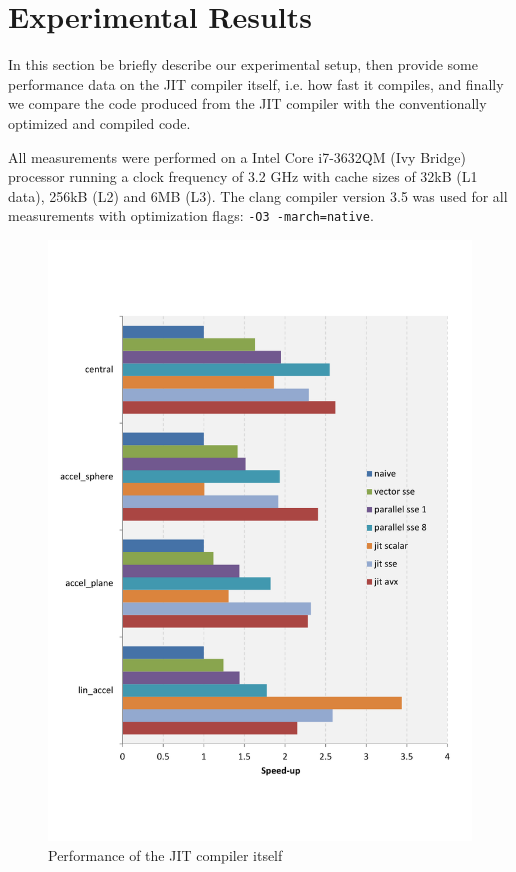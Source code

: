 \section{Experimental Results}\label{sec:exp}

In this section be briefly describe our experimental setup, then provide some performance data on the JIT compiler itself, i.e. how fast it compiles, and finally we compare the code produced from the JIT compiler with the conventionally optimized and compiled code.


All measurements were performed on a Intel Core i7-3632QM (Ivy Bridge) processor running a clock frequency of 3.2 GHz with cache sizes of 32kB (L1 data), 256kB (L2) and 6MB (L3). The clang compiler version 3.5 was used for all measurements with optimization flags: \texttt{-O3 -march=native}.



\begin{figure}\centering
  \includegraphics[scale=0.6]{single_dual_rules.pdf}
  \caption{Performance of the JIT compiler itself
  \label{perf_jit}}
\end{figure}


